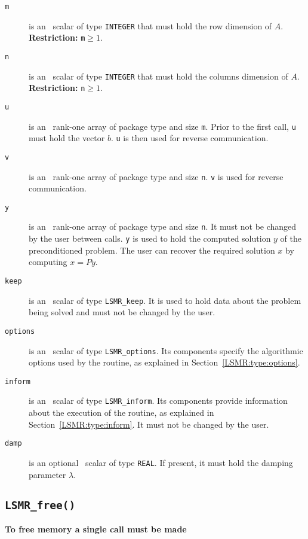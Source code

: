 \begin{description}
\item[\texttt{m}] is an \intentin\ scalar of type {\tt INTEGER} that must hold 
the row dimension of $A$. {\bf Restriction:} {\tt m}$ \ge 1$.

\item[\texttt{n}] is an \intentin\ scalar of type {\tt INTEGER} that must hold 
the columns dimension of $A$.  {\bf Restriction:} {\tt n}$ \ge 1$.

\item[\texttt{u}] is an \intentinout\ rank-one array of package type 
and size {\tt m}. Prior to the first call, {\tt u} must hold the vector $b$.
{\tt u} is then used for reverse communication.

\item[\texttt{v}] is an \intentinout\ rank-one array of package type 
and size {\tt n}. {\tt v} is used for reverse communication.


\item[\texttt{y}] is an \intentinout\ rank-one array of package type 
and size {\tt n}. It must not be changed by the user between calls.
{\tt y} is used to hold the computed solution $y$ of the
preconditioned problem. The user can recover the required solution $x$ by computing
$x = Py$.

\item[\texttt{keep}] is an \intentinout\ scalar of type
{\tt LSMR\_keep}. It is used to hold data about the problem being
solved and must not be changed by the user.

\item[\texttt{options}] is an \intentin\ scalar of type {\tt LSMR\_options}.
Its components specify the algorithmic options used by the routine, as
explained in Section~\ref{LSMR:type:options}.

\item[\texttt{inform}] is an \intentinout\ scalar of type
{\tt LSMR\_inform}. Its components provide information about the execution
of the routine, as explained in Section~\ref{LSMR:type:inform}.
It must not be changed by the user.

\item[\texttt{damp}] is an optional \intentin\ scalar of type
{\tt REAL}. If present, it must hold the damping parameter $\lambda$.

\end{description}



\subsection{\texttt{LSMR\_free()}}
\textbf{To free memory a single call must be made}
\vspace{0.2cm}

